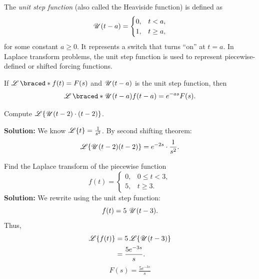   \begin{definition}
    The \emph{unit step function} (also called the Heaviside function) is defined as
    \[
    \operatorname{\mathscr{U}}(t-a) = 
    \begin{cases}
    0, & t < a, \\
    1, & t \geq a,
    \end{cases}
    \]
    for some constant $a \geq 0$.  
    It represents a switch that turns ``on'' at $t=a$.  
    In Laplace transform problems, the unit step function is used to represent piecewise-defined or shifted forcing functions.
  \end{definition}


  \begin{marginfigure}
    
  \end{marginfigure}


  \begin{theorem}
    If $\laplace\braced*{f(t)} = F(s)$ and $\operatorname{\mathscr{U}}(t-a)$ is the unit step function, then
    \[
    \laplace\braced*{\hstep(t-a) f(t-a)} = e^{-as} F(s).
    \]
  \end{theorem}

  \begin{example}
    Compute $\operatorname{\mathscr{L}}\{\operatorname{\mathscr{U}}(t-2) \cdot (t-2)\}$.

    \textbf{Solution:}  
    We know $\operatorname{\mathscr{L}}\{t\} = \frac{1}{s^2}$. By second shifting theorem:
    \[
    \operatorname{\mathscr{L}}\{\operatorname{\mathscr{U}}(t-2)(t-2)\} = e^{-2s} \cdot \frac{1}{s^2}.
    \]
  \end{example}

  
  \begin{example}
    Find the Laplace transform of the piecewise function
    \[
    f(t) = 
    \begin{cases}
    0, & 0 \leq t < 3,\\
    5, & t \geq 3.
    \end{cases}
    \]
    \textbf{Solution:}
    We rewrite using the unit step function:
    \[
    f(t) = 5\,\operatorname{\mathscr{U}}(t-3).
    \]
    Thus,
    \begin{align*}
      \operatorname{\mathscr{L}}\{f(t)\} &= 5 \operatorname{\mathscr{L}}\{\operatorname{\mathscr{U}}(t-3)\}\\
      &= \frac{5 e^{-3s}}{s}.
    \end{align*}
    \[
    \boxed{F(s) = \tfrac{5 e^{-3s}}{s}}
    \]
  \end{example}

